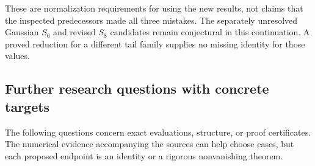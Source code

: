 \documentclass[11pt]{article}
\theoremstyle{definition}
\theoremstyle{remark}
\numberwithin{equation}{section}
\begin{document}
These are normalization requirements for using the new results, not
claims that the inspected predecessors made all three mistakes.
The separately unresolved Gaussian $S_6$ and revised $S_8$ candidates
remain conjectural in this continuation. A proved reduction for a
different tail family supplies no missing identity for those values.

\subsection{Further research questions with concrete targets}
\label{sec:questions}

The following questions concern exact evaluations, structure, or proof
certificates. The numerical evidence accompanying the sources can help
choose cases, but each proposed endpoint is an identity or a rigorous
nonvanishing theorem.
\end{document}
